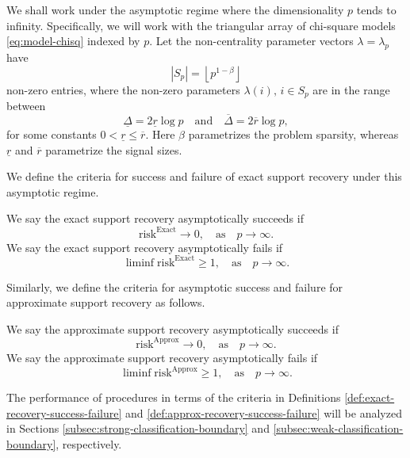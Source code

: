 
We shall work under the asymptotic regime where the dimensionality $p$ tends to infinity.
Specifically, we will work with the triangular array of chi-square models \eqref{eq:model-chisq} indexed by $p$.
Let the non-centrality parameter vectors $\lambda = \lambda_p$ have 
\begin{equation} \label{eq:signal-sparsity}
    |S_p| = \left\lfloor p^{1-\beta} \right\rfloor
\end{equation}
non-zero entries, where the non-zero parameters $\lambda(i),\,i\in S_p$ are in the range between
\begin{equation} \label{eq:signal-size}
    \underline{\Delta} = 2\underline{r}\log{p}
    \quad\text{and}\quad
    \overline{\Delta} = 2\overline{r}\log{p},
\end{equation}
for some constants $0<\underline{r}\le\overline{r}$.
Here $\beta$ parametrizes the problem sparsity, whereas $\underline{r}$ and $\overline{r}$ parametrize the signal sizes.

We define the criteria for success and failure of exact support recovery under this asymptotic regime.
\begin{definition} \label{def:exact-recovery-success-failure}
We say the exact support recovery asymptotically succeeds if 
\begin{equation} \label{eq:exact-recovery-success}
    \mathrm{risk}^{\mathrm{Exact}}\to0, \quad \text{as}\quad p\to\infty.
\end{equation}
We say the exact support recovery asymptotically fails if 
\begin{equation} \label{eq:exact-recovery-failure}
    \liminf\mathrm{risk}^{\mathrm{Exact}}\ge1, \quad \text{as}\quad p\to\infty.
\end{equation}
\end{definition}
Similarly, we define the criteria for asymptotic success and failure for approximate support recovery as follows.
\begin{definition} \label{def:approx-recovery-success-failure}
We say the approximate support recovery asymptotically succeeds if 
\begin{equation} \label{eq:approx-recovery-success}
    \mathrm{risk}^{\mathrm{Approx}}\to0, \quad \text{as}\quad p\to\infty.
\end{equation}
We say the approximate support recovery asymptotically fails if 
\begin{equation} \label{eq:approx-recovery-failure}
    \liminf\mathrm{risk}^{\mathrm{Approx}}\ge1, \quad \text{as}\quad p\to\infty.
\end{equation}
\end{definition}
The performance of procedures in terms of the criteria in Definitions \ref{def:exact-recovery-success-failure} and \ref{def:approx-recovery-success-failure} will be analyzed in Sections \ref{subsec:strong-classification-boundary} and \ref{subsec:weak-classification-boundary}, respectively.

